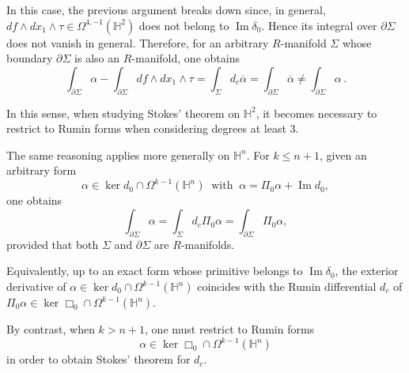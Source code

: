 \documentclass[dvipsnames]{amsart}
\theoremstyle{definition}
\theoremstyle{definition}
\numberwithin{equation}{section}
\renewcommand{\H}{\mathbb{H}}
\begin{document}
In this case, the previous argument breaks down since, in general,
$df\wedge dx_1\wedge\tau\in\Omega^{4,-1}(\H^2)$
does not belong to \(\operatorname{Im}\delta_0\). Hence its integral over \(\partial\Sigma\) does not vanish in general. Therefore, for an arbitrary \(R\)-manifold \(\Sigma\) whose boundary \(\partial\Sigma\) is also an \(R\)-manifold, one obtains
\[
\int_{\partial\Sigma}\alpha
-\int_{\partial\Sigma}df\wedge dx_1\wedge\tau
=\int_{\Sigma}d_c\overline{\alpha}
=\int_{\partial\Sigma}\overline{\alpha}
\neq
\int_{\partial\Sigma}\alpha\,.
\]

In this sense, when studying Stokes' theorem on \(\H^2\), it becomes necessary to restrict to Rumin forms when considering degrees at least 3.

The same reasoning applies more generally on \(\H^n\). For \(k\leq n+1\), given an arbitrary form
\[
\alpha\in\ker d_0\cap\Omega^{k-1}(\H^n)\ \text{ with }\
\alpha=\Pi_0\alpha+\operatorname{Im}d_0,
\]
one obtains
\[
\int_{\partial\Sigma}\alpha
=
\int_{\Sigma}d_c\Pi_0\alpha
=
\int_{\partial\Sigma}\Pi_0\alpha,
\]
provided that both \(\Sigma\) and \(\partial\Sigma\) are \(R\)-manifolds.

Equivalently, up to an exact form whose primitive belongs to \(\operatorname{Im}\delta_0\), the exterior derivative of $\alpha\in\ker d_0\cap\Omega^{k-1}(\H^n)$
coincides with the Rumin differential \(d_c\) of $\Pi_0\alpha\in\ker\Box_0\cap\Omega^{k-1}(\H^n)$.

By contrast, when \(k>n+1\), one must restrict to Rumin forms
\[
\alpha\in\ker\Box_0\cap\Omega^{k-1}(\H^n)
\]
in order to obtain Stokes' theorem for \(d_c\).
\end{document}
